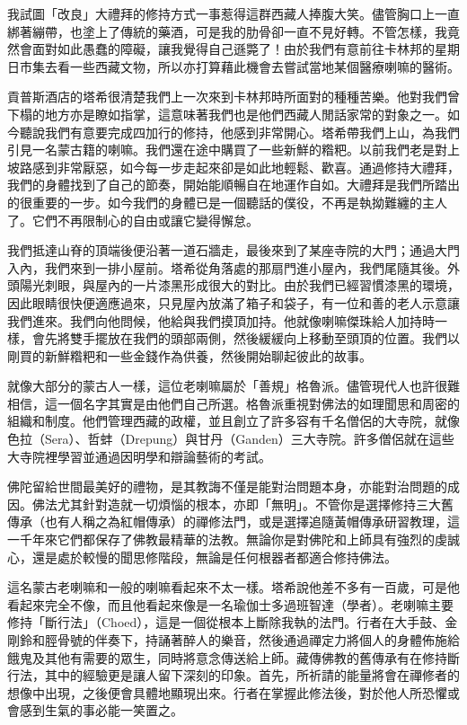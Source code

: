 我試圖「改良」大禮拜的修持方式一事惹得這群西藏人捧腹大笑。儘管胸口上一直綁著繃帶，也塗上了傳統的藥酒，可是我的肋骨卻一直不見好轉。不管怎樣，我竟然會面對如此愚蠢的障礙，讓我覺得自己遜斃了！由於我們有意前往卡林邦的星期日市集去看一些西藏文物，所以亦打算藉此機會去嘗試當地某個醫療喇嘛的醫術。

貢普斯酒店的塔希很清楚我們上一次來到卡林邦時所面對的種種苦樂。他對我們曾下榻的地方亦是瞭如指掌，這意味著我們也是他們西藏人閒話家常的對象之一。如今聽說我們有意要完成四加行的修持，他感到非常開心。塔希帶我們上山，為我們引見一名蒙古籍的喇嘛。我們還在途中購買了一些新鮮的糌粑。以前我們老是對上坡路感到非常厭惡，如今每一步走起來卻是如此地輕鬆、歡喜。通過修持大禮拜，我們的身體找到了自己的節奏，開始能順暢自在地運作自如。大禮拜是我們所踏出的很重要的一步。如今我們的身體已是一個聽話的僕役，不再是執拗難纏的主人了。它們不再限制心的自由或讓它變得懈怠。

我們抵達山脊的頂端後便沿著一道石牆走，最後來到了某座寺院的大門；通過大門入內，我們來到一排小屋前。塔希從角落處的那扇門進小屋內，我們尾隨其後。外頭陽光刺眼，與屋內的一片漆黑形成很大的對比。由於我們已經習慣漆黑的環境，因此眼睛很快便適應過來，只見屋內放滿了箱子和袋子，有一位和善的老人示意讓我們進來。我們向他問候，他給與我們摸頂加持。他就像喇嘛傑珠給人加持時一樣，會先將雙手擺放在我們的頭部兩側，然後緩緩向上移動至頭頂的位置。我們以剛買的新鮮糌粑和一些金錢作為供養，然後開始聊起彼此的故事。

就像大部分的蒙古人一樣，這位老喇嘛屬於「善規」格魯派。儘管現代人也許很難相信，這一個名字其實是由他們自己所選。格魯派重視對佛法的如理聞思和周密的組織和制度。他們管理西藏的政權，並且創立了許多容有千名僧侶的大寺院，就像色拉（Sera）、哲蚌（Drepung）與甘丹（Ganden）三大寺院。許多僧侶就在這些大寺院裡學習並通過因明學和辯論藝術的考試。

佛陀留給世間最美好的禮物，是其教誨不僅是能對治問題本身，亦能對治問題的成因。佛法尤其針對造就一切煩惱的根本，亦即「無明」。不管你是選擇修持三大舊傳承（也有人稱之為紅帽傳承）的禪修法門，或是選擇追隨黃帽傳承研習教理，這一千年來它們都保存了佛教最精華的法教。無論你是對佛陀和上師具有強烈的虔誠心，還是處於較慢的聞思修階段，無論是任何根器者都適合修持佛法。

這名蒙古老喇嘛和一般的喇嘛看起來不太一樣。塔希說他差不多有一百歲，可是他看起來完全不像，而且他看起來像是一名瑜伽士多過班智達（學者）。老喇嘛主要修持「斷行法」（Choed），這是一個從根本上斷除我執的法門。行者在大手鼓、金剛鈴和脛骨號的伴奏下，持誦著醉人的樂音，然後通過禪定力將個人的身體佈施給餓鬼及其他有需要的眾生，同時將意念傳送給上師。藏傳佛教的舊傳承有在修持斷行法，其中的經驗更是讓人留下深刻的印象。首先，所祈請的能量將會在禪修者的想像中出現，之後便會具體地顯現出來。行者在掌握此修法後，對於他人所恐懼或會感到生氣的事必能一笑置之。

